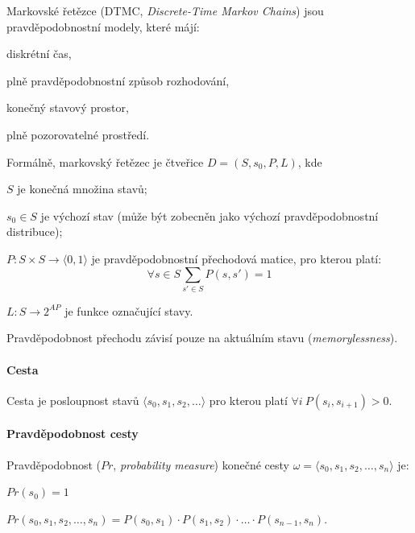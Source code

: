 \begin{compactitem}
    \item Markovské řetězce (DTMC, \textit{Discrete-Time Markov Chains}) jsou pravděpodobnostní modely, které májí: \begin{compactitem}
        \item diskrétní čas,
        \item plně pravděpodobnostní způsob rozhodování,
        \item konečný stavový prostor,
        \item plně pozorovatelné prostředí.
    \end{compactitem}

    \item Formálně, markovský řetězec je čtveřice $D = (S, s_0, P, L)$, kde \begin{compactitem}
        \item $S$ je konečná množina stavů;
        \item $s_0 \in S$ je výchozí stav (může být zobecněn jako výchozí pravděpodobnostní distribuce);
        \item $P : S \times S \rightarrow \langle 0, 1 \rangle$ je pravděpodobnostní přechodová matice, pro kterou platí: $$ \forall s \in S \sum_{s' \in S} P(s, s') = 1 $$
        \item $L : S \rightarrow 2^{AP}$ je funkce označující stavy.
    \end{compactitem}

    \item Pravděpodobnost přechodu závisí pouze na aktuálním stavu (\textit{memorylessness}).

\end{compactitem}

\paragraph*{Cesta} Cesta je posloupnost stavů $\langle s_0, s_1, s_2, \dots \rangle$ pro kterou platí $\forall i ~ P(s_i, s_{i+1}) > 0$.

\paragraph*{Pravděpodobnost cesty} Pravděpodobnost ($Pr$, \textit{probability measure}) konečné cesty $\omega = \langle s_0, s_1, s_2, \dots, s_n \rangle$ je: \begin{compactitem}
    \item $Pr(s_0) = 1$
    \item $Pr( s_0, s_1, s_2, \dots, s_n ) = P(s_0, s_1) \cdot P(s_1, s_2) \cdot \ldots \cdot P(s_{n-1}, s_n) $.
\end{compactitem}

